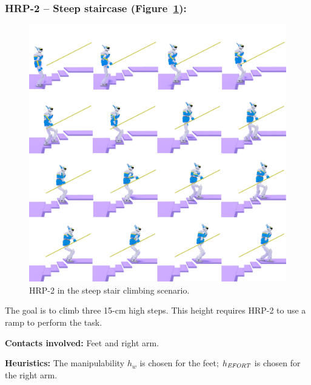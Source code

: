 \subsubsection{HRP-2 -- Steep staircase (Figure~\ref{fig:stair_robust}):}

\begin{figure}
  \centering
  \includegraphics[width=1\linewidth]{figures/stair}
  \caption{
           HRP-2 in the steep stair climbing scenario. }
		   \label{fig:stair_robust}
\end{figure}

The goal is to climb three 15-cm high steps. This height requires HRP-2 to use a ramp to perform the task.

\noindent\textbf{Contacts involved:} Feet and right arm.

\noindent\textbf{Heuristics:} The manipulability $h_w$ is chosen for the feet; $h_{\textrm{\it EFORT}}$ is chosen for the right arm.

